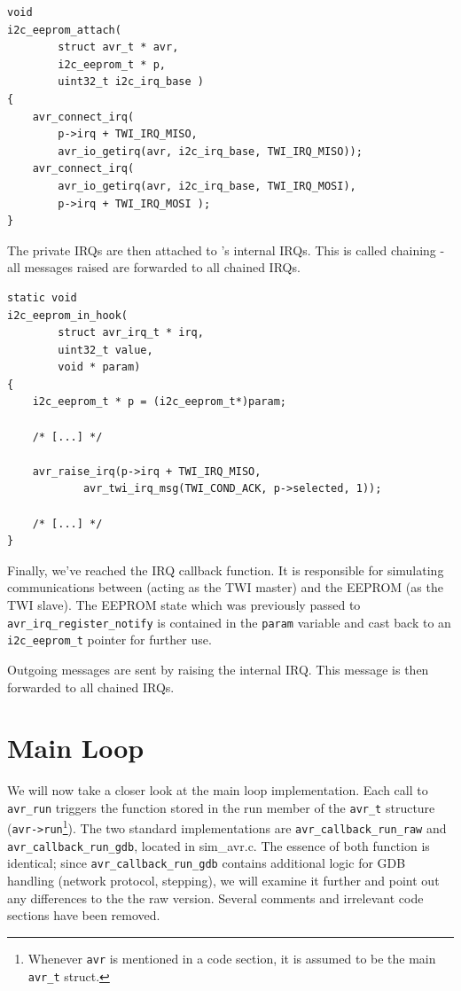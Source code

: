 \begin{lstlisting}
void
i2c_eeprom_attach(
		struct avr_t * avr,
		i2c_eeprom_t * p,
		uint32_t i2c_irq_base )
{
	avr_connect_irq(
		p->irq + TWI_IRQ_MISO,
		avr_io_getirq(avr, i2c_irq_base, TWI_IRQ_MISO));
	avr_connect_irq(
		avr_io_getirq(avr, i2c_irq_base, TWI_IRQ_MOSI),
		p->irq + TWI_IRQ_MOSI );
}
\end{lstlisting}

The private \acp{IRQ} are then attached to \simavr's internal \acp{IRQ}. This is called
chaining - all messages raised are forwarded to all chained \acp{IRQ}.

\begin{lstlisting}
static void
i2c_eeprom_in_hook(
		struct avr_irq_t * irq,
		uint32_t value,
		void * param)
{
	i2c_eeprom_t * p = (i2c_eeprom_t*)param;

    /* [...] */

    avr_raise_irq(p->irq + TWI_IRQ_MISO,
            avr_twi_irq_msg(TWI_COND_ACK, p->selected, 1));

    /* [...] */
}
\end{lstlisting}

Finally, we've reached the \ac{IRQ} callback function. It is responsible for
simulating communications between \simavr (acting as the \ac{TWI} master) and the
\ac{EEPROM} (as the \ac{TWI} slave). The \ac{EEPROM} state which was previously passed to
\lstinline|avr_irq_register_notify| is contained in the \lstinline|param| variable and cast back to
an \lstinline|i2c_eeprom_t| pointer for further use.

Outgoing messages are sent by raising the internal \ac{IRQ}. This message is then
forwarded to all chained \acp{IRQ}.


\section{Main Loop} \label{section:mainloop}

We will now take a closer look at the main loop implementation. Each call to
\lstinline|avr_run| triggers the function stored in the run member of the \lstinline|avr_t| structure
(\lstinline|avr->run|\footnote{Whenever \lstinline|avr| is mentioned in a code
section, it is assumed to be the main \lstinline|avr_t| struct.}).
The two standard implementations are \lstinline|avr_callback_run_raw| and
\lstinline|avr_callback_run_gdb|, located in sim\_avr.c. The essence of both function is
identical; since \lstinline|avr_callback_run_gdb| contains additional logic for \ac{GDB}
handling (network protocol, stepping), we will examine it further and point out
any differences to the the raw version. Several comments and irrelevant code
sections have been removed.

